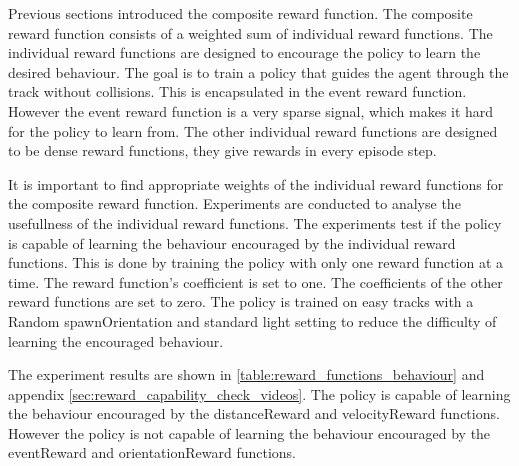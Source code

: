 Previous sections introduced the composite reward function. The composite reward function consists of a weighted sum of individual reward functions. The individual reward functions are designed to encourage the policy to learn the desired behaviour. The goal is to train a policy that guides the agent through the track without collisions. This is encapsulated in the event reward function. However the event reward function is a very sparse signal, which makes it hard for the policy to learn from. The other individual reward functions are designed to be dense reward functions, they give rewards in every episode step.


It is important to find appropriate weights of the individual reward functions for the composite reward function. Experiments are conducted to analyse the usefullness of the individual reward functions. The experiments test if the policy is capable of learning the behaviour encouraged by the individual reward functions.
This is done by training the policy with only one reward function at a time. The reward function's coefficient is set to one. The coefficients of the other reward functions are set to zero. The policy is trained on easy tracks with a Random spawnOrientation and standard light setting to reduce the difficulty of learning the encouraged behaviour.


The experiment results are shown in \ref{table:reward_functions_behaviour} and appendix \ref{sec:reward_capability_check_videos}. The policy is capable of learning the behaviour encouraged by the distanceReward and velocityReward functions. However the policy is not capable of learning the behaviour encouraged by the eventReward and orientationReward functions.


